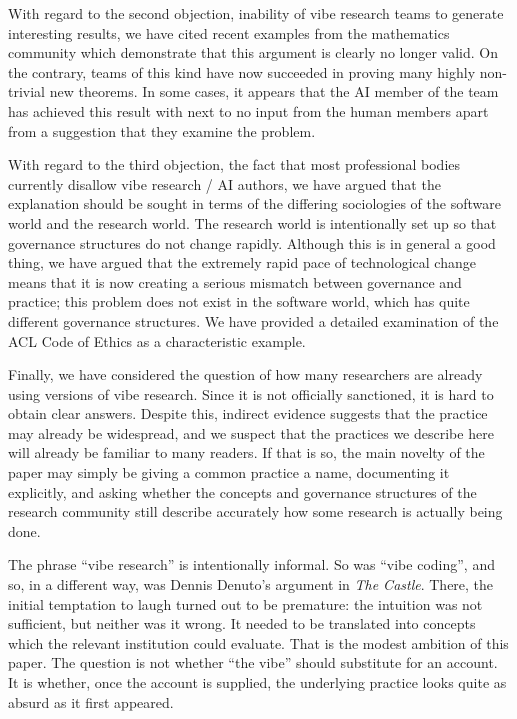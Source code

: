 \documentclass[12pt]{article}
\begin{document}
With regard to the second objection, inability of vibe research teams to generate interesting results, we have cited recent examples from the mathematics community which demonstrate that this argument is clearly no longer valid. On the contrary, teams of this kind have now succeeded in proving many highly non-trivial new theorems. In some cases, it appears that the AI member of the team has achieved this result with next to no input from the human members apart from a suggestion that they examine the problem.

With regard to the third objection, the fact that most professional bodies currently disallow vibe research / AI authors, we have argued that the explanation should be sought in terms of the differing sociologies of the software world and the research world. The research world is intentionally set up so that governance structures do not change rapidly. Although this is in general a good thing, we have argued that the extremely rapid pace of technological change means that it is now creating a serious mismatch between governance and practice; this problem does not exist in the software world, which has quite different governance structures. We have provided a detailed examination of the ACL Code of Ethics as a characteristic example.

Finally, we have considered the question of how many researchers are already using versions of vibe research. Since it is not officially sanctioned, it is hard to obtain clear answers. Despite this, indirect evidence suggests that the practice may already be widespread, and we suspect that the practices we describe here will already be familiar to many readers. 
If that is so, the main novelty of the paper may simply be giving a common practice a name, documenting it explicitly, and asking whether the concepts and governance structures of the research community still describe accurately how some research is actually being done.

The phrase ``vibe research'' is intentionally informal. So was ``vibe coding'', and so, in a different way, was Dennis Denuto's argument in \emph{The Castle}. There, the initial temptation to laugh turned out to be premature: the intuition was not sufficient, but neither was it wrong. It needed to be translated into concepts which the relevant institution could evaluate.
That is the modest ambition of this paper. The question is not whether ``the vibe'' should substitute for an account. It is whether, once the account is supplied, the underlying practice looks quite as absurd as it first appeared.

{}


\end{document}

